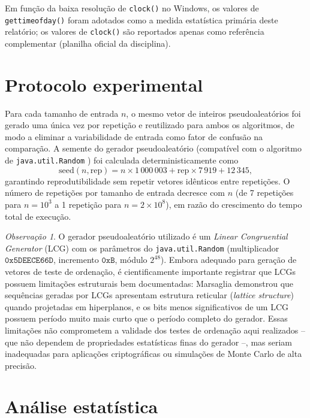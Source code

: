 \documentclass[
	12pt,
	oneside,
	a4paper,
	chapter=TITLE,
	section=TITLE,
	subsection=TITLE,
	subsubsection=TITLE,
	english,
	brazil
]{abntex2}
\theoremstyle{plain}
\theoremstyle{remark}
\newtheorem*{observacao}{Observação}
\renewcommand{\_}{\underscoreoriginal\allowbreak}
\begin{document}
Em função da baixa resolução de \texttt{clock()} no Windows, os valores de \texttt{gettimeofday()} foram adotados como a medida estatística primária deste relatório; os valores de \texttt{clock()} são reportados apenas como referência complementar (planilha oficial da disciplina).

\section{Protocolo experimental}

Para cada tamanho de entrada $n$, o mesmo vetor de inteiros pseudoaleatórios foi gerado uma única vez por repetição e reutilizado para ambos os algoritmos, de modo a eliminar a variabilidade de entrada como fator de confusão na comparação. A semente do gerador pseudoaleatório (compatível com o algoritmo de \texttt{java.util.Random} \cite{oracle_random}) foi calculada deterministicamente como
\[
\text{seed}(n, \text{rep}) = n \times 1\,000\,003 + \text{rep} \times 7\,919 + 12\,345,
\]
garantindo reprodutibilidade sem repetir vetores idênticos entre repetições. O número de repetições por tamanho de entrada decresce com $n$ (de 7 repetições para $n=10^{3}$ a 1 repetição para $n=2\times10^{8}$), em razão do crescimento do tempo total de execução.

\begin{observacao}
O gerador pseudoaleatório utilizado é um \emph{Linear Congruential Generator} (LCG) com os parâmetros do \texttt{java.util.Random} (multiplicador $\mathtt{0x5DEECE66D}$, incremento $\mathtt{0xB}$, módulo $2^{48}$). Embora adequado para geração de vetores de teste de ordenação, é cientificamente importante registrar que LCGs possuem limitações estruturais bem documentadas: Marsaglia \cite{marsaglia1968} demonstrou que sequências geradas por LCGs apresentam estrutura reticular (\emph{lattice structure}) quando projetadas em hiperplanos, e os bits menos significativos de um LCG possuem período muito mais curto que o período completo do gerador. Essas limitações não comprometem a validade dos testes de ordenação aqui realizados -- que não dependem de propriedades estatísticas finas do gerador --, mas seriam inadequadas para aplicações criptográficas ou simulações de Monte Carlo de alta precisão.
\end{observacao}

\section{Análise estatística}
\end{document}
